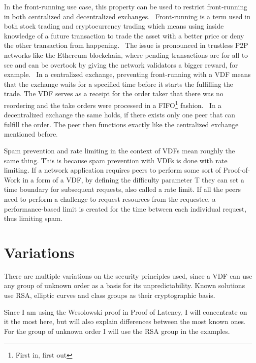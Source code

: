 In the front-running use case, this property can be used to restrict front-running in both centralized and decentralized exchanges.~\cite{Khalil2019-sl} Front-running is a term used in both stock trading and cryptocurrency trading which means using inside knowledge of a future transaction to trade the asset with a better price or deny the other transaction from happening.~\cite{Robinson2020-ve} The issue is pronounced in trustless P2P networks like the Ethereum blockchain, where pending transactions are for all to see and can be overtook by giving the network validators a bigger reward, for example.~\cite{Mitchell2020-hn} In a centralized exchange, preventing front-running with a VDF means that the exchange waits for a specified time before it starts the fulfilling the trade. The VDF serves as a receipt for the order taker that there was no reordering and the take orders were processed in a FIFO\footnote{First in, first out} fashion.~\cite{Cline2020-wb} In a decentralized exchange the same holds, if there exists only one peer that can fulfill the order. The peer then functions exactly like the centralized exchange mentioned before.

Spam prevention and rate limiting in the context of VDFs mean roughly the same thing. This is because spam prevention with VDFs is done with rate limiting. If a network application requires peers to perform some sort of Proof-of-Work in a form of a VDF, by defining the difficulty parameter T they can set a time boundary for subsequent requests, also called a rate limit. If all the peers need to perform a challenge to request resources from the requestee, a performance-based limit is created for the time between each individual request, thus limiting spam.

\section{Variations}
There are multiple variations on the security principles used, since a VDF can use any group of unknown order as a basis for its unpredictability. Known solutions use RSA, elliptic curves and class groups as their cryptographic basis.


Since I am using the Wesolowski proof in Proof of Latency, I will concentrate on it the most here, but will also explain differences between the most known ones. For the group of unknown order I will use the RSA group in the examples.

